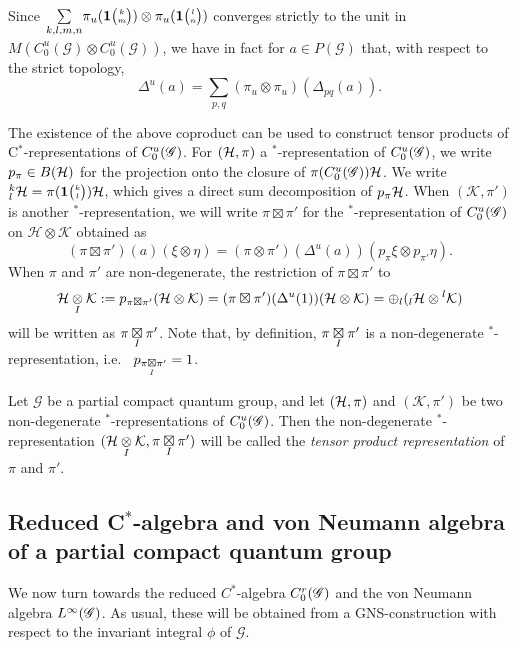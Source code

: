 Since $\underset{k,l,m,n}{\sum} \pi_u(\mathbf{1}{\tiny {\begin{pmatrix} k\\m\end{pmatrix}}})\otimes \pi_u(\mathbf{1}{\tiny {\begin{pmatrix} l\\n\end{pmatrix}}})$ converges strictly to the unit in $M(C_0^u(\mathscr{G})\otimes C_0^u(\mathscr{G}))$, we have in fact for $a\in P(\mathscr{G})$ that, with respect to the strict topology, \[\Delta^u(a) = \sum_{p,q} (\pi_{u} \otimes \pi_{u})(\Delta_{pq}(a)).\]

The existence of the above coproduct can be used to construct tensor products of C$^*$-representations of $C^{u}_{0}(\mathscr{G})$. For $(\mathcal{H},\pi)$ a $^*$-representation of $C^{u}_{0}(\mathscr{G})$, we write $p_{\pi}\in B(\mathcal{H})$ for the projection onto the closure of $\pi(C^{u}_{0}(\mathscr{G}))\mathcal{H}$. We write ${}^{k}_{l}\mathcal{H} = \pi(\mathbf{1}{\tiny {\begin{pmatrix} k\\l\end{pmatrix}}})\mathcal{H}$, which gives a direct sum decomposition of $p_{\pi}\mathcal{H}$.  When $(\mathcal{K},\pi')$ is another $^*$-representation, we will write $\pi \boxtimes \pi'$ for the $^*$-representation of $C^{u}_{0}(\mathscr{G})$ on $\mathcal{H}\otimes \mathcal{K}$ obtained as \[(\pi \boxtimes \pi')(a)(\xi\otimes \eta) = (\pi\otimes \pi')(\Delta^u(a))(p_{\pi}\xi\otimes p_{\pi'}\eta).\] When $\pi$ and $\pi'$ are non-degenerate, the restriction of $\pi\boxtimes \pi'$ to \[\mathcal{H}\underset{I}{\otimes} \mathcal{K} := p_{\pi \boxtimes \pi'}(\mathcal{H}\otimes \mathcal{K}) = (\pi \boxtimes \pi')(\Delta^u(1))(\mathcal{H}\otimes \mathcal{K})= \oplus_l ({}_l\mathcal{H}\otimes {}^l\mathcal{K})\] will be written as $\pi\underset{I}{\boxtimes} \pi'$. Note that, by definition, $\pi\underset{I}{\boxtimes} \pi'$ is a non-degenerate $^*$-representation, i.e.~ $p_{\pi\underset{I}{\boxtimes} \pi'} = 1$. 

\begin{Def}\label{DefTenProd}  Let $\mathscr{G}$ be a partial compact quantum group, and let $(\mathcal{H},\pi)$ and $(\mathcal{K},\pi')$ be two non-degenerate $^*$-representations of $C^{u}_{0}(\mathscr{G})$. Then the non-degenerate $^*$-representation $(\mathcal{H}\underset{I}{\otimes} \mathcal{K},\pi\underset{I}{\boxtimes} \pi')$ will be called the \emph{tensor product representation} of $\pi$ and $\pi'$. 
\end{Def} 

\subsection{Reduced C$^*$-algebra and von Neumann algebra of a partial compact quantum group}

We now turn towards the reduced $C^{*}$-algebra $C^{r}_{0}(\mathscr{G})$ and the von Neumann algebra $L^{\infty}(\mathscr{G})$. As usual, these will be obtained from a GNS-construction with respect to the invariant integral $\phi$ of $\mathscr{G}$. 


